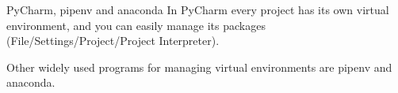 \documentclass[aspectratio=169,handout]{beamer}
\begin{document}
\begin{frame}{PyCharm, pipenv and anaconda}
    In PyCharm every project has its own virtual environment, and you can easily manage its packages
    (File/Settings/Project/Project Interpreter).

    Other widely used programs for managing virtual environments are pipenv and anaconda.
\end{frame}
\end{document}
